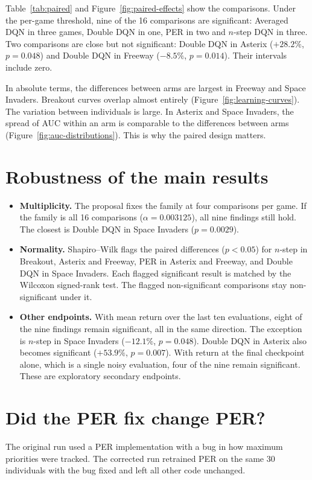 \documentclass[11pt,a4paper]{article}
\begin{document}
Table~\ref{tab:paired} and Figure~\ref{fig:paired-effects} show the
comparisons. Under the per-game threshold, nine of the 16 comparisons are
significant: Averaged DQN in three games, Double DQN in one, PER in two and
$n$-step DQN in three. Two comparisons are close but not significant:
Double DQN in Asterix ($+28.2\%$, $p=0.048$) and Double DQN in Freeway
($-8.5\%$, $p=0.014$). Their intervals include zero.

In absolute terms, the differences between arms are largest in Freeway and
Space Invaders. Breakout curves overlap almost entirely
(Figure~\ref{fig:learning-curves}). The variation between individuals is
large. In Asterix and Space Invaders, the spread of AUC within an arm is
comparable to the differences between arms (Figure~\ref{fig:auc-distributions}).
This is why the paired design matters.

\section*{Robustness of the main results}
\begin{itemize}
    \item \textbf{Multiplicity.} The proposal fixes the family at four
    comparisons per game. If the family is all 16 comparisons
    ($\alpha = 0.003125$), all nine findings still hold. The closest is
    Double DQN in Space Invaders ($p = 0.0029$).
    \item \textbf{Normality.} Shapiro--Wilk flags the paired differences
    ($p<0.05$) for $n$-step in Breakout, Asterix and Freeway, PER in Asterix
    and Freeway, and Double DQN in Space Invaders. Each flagged significant
    result is matched by the Wilcoxon signed-rank test. The flagged
    non-significant comparisons stay non-significant under it.
    \item \textbf{Other endpoints.} With mean return over the last ten
    evaluations, eight of the nine findings remain significant, all in the
    same direction. The exception is $n$-step in Space Invaders ($-12.1\%$,
    $p=0.048$). Double DQN in Asterix also becomes significant ($+53.9\%$,
    $p=0.007$). With return at the final checkpoint alone, which is a single
    noisy evaluation, four of the nine remain significant. These are
    exploratory secondary endpoints.
\end{itemize}

\section*{Did the PER fix change PER?}\label{sec:per-fix}
The original run used a PER implementation with a bug in how maximum
priorities were tracked. The corrected run retrained PER on the same 30
individuals with the bug fixed and left all other code unchanged.
\end{document}
